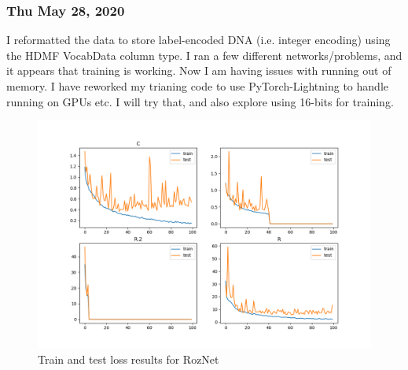 \documentclass{article}
\begin{document}
\subsubsection*{Thu May 28, 2020}
I reformatted the data to store label-encoded DNA (i.e. integer encoding) using the HDMF VocabData column type. I ran
a few different networks/problems, and it appears that training is working. Now I am having issues with running out of
memory. I have reworked my trianing code to use PyTorch-Lightning to handle running on GPUs etc. I will try that, and 
also explore using 16-bits for training. 

\begin{figure}
  \includegraphics[width=\linewidth]{encoding_fix.results.png}
  \caption{Train and test loss results for RozNet}
  \label{fig:roznet_train_test}
\end{figure}
\end{document}
